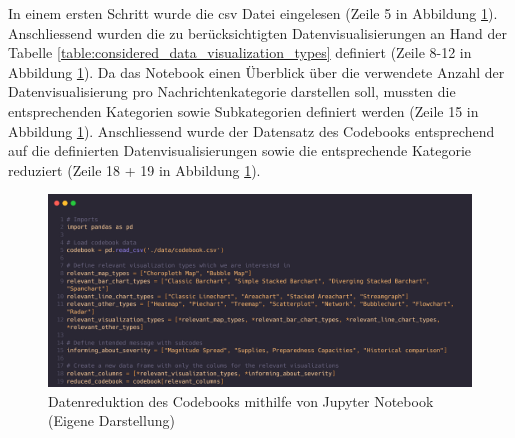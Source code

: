\begin{table}[h]
\centering
{}
\caption{Berücksichtigte Datenvisualisierungen des Jupyter Notebooks (Eigene Darstellung)}
\label{table:considered_data_visualization_types}
\end{table}

In einem ersten Schritt wurde die \gls{csv} Datei eingelesen (Zeile 5 in Abbildung \ref{fig:jupyter_notebook_data_reduction}). Anschliessend wurden die zu berücksichtigten Datenvisualisierungen an Hand der Tabelle \ref{table:considered_data_visualization_types} definiert (Zeile 8-12 in Abbildung \ref{fig:jupyter_notebook_data_reduction}). Da das Notebook einen Überblick über die verwendete Anzahl der Datenvisualisierung pro Nachrichtenkategorie darstellen soll, mussten die entsprechenden Kategorien sowie Subkategorien definiert werden (Zeile 15 in Abbildung \ref{fig:jupyter_notebook_data_reduction}). Anschliessend wurde der Datensatz des Codebooks entsprechend auf die definierten Datenvisualisierungen sowie die entsprechende Kategorie reduziert (Zeile 18 + 19 in Abbildung \ref{fig:jupyter_notebook_data_reduction}).

 \begin{figure}[h]
    \includegraphics[width=14cm]{images/jupyter_notebook_data_reduction.png}
    \centering
    \caption{Datenreduktion des Codebooks mithilfe von Jupyter Notebook (Eigene Darstellung)}
    \label{fig:jupyter_notebook_data_reduction}
\end{figure}


